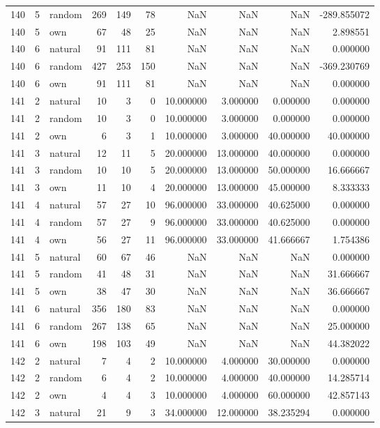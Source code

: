 \begin{table}[htbp]
\begin{tabular}{rrlrrrrrrr}
140 & 5 & random & 269 & 149 & 78 & NaN & NaN & NaN & -289.855072 \\
140 & 5 & own & 67 & 48 & 25 & NaN & NaN & NaN & 2.898551 \\
140 & 6 & natural & 91 & 111 & 81 & NaN & NaN & NaN & 0.000000 \\
140 & 6 & random & 427 & 253 & 150 & NaN & NaN & NaN & -369.230769 \\
140 & 6 & own & 91 & 111 & 81 & NaN & NaN & NaN & 0.000000 \\
141 & 2 & natural & 10 & 3 & 0 & 10.000000 & 3.000000 & 0.000000 & 0.000000 \\
141 & 2 & random & 10 & 3 & 0 & 10.000000 & 3.000000 & 0.000000 & 0.000000 \\
141 & 2 & own & 6 & 3 & 1 & 10.000000 & 3.000000 & 40.000000 & 40.000000 \\
141 & 3 & natural & 12 & 11 & 5 & 20.000000 & 13.000000 & 40.000000 & 0.000000 \\
141 & 3 & random & 10 & 10 & 5 & 20.000000 & 13.000000 & 50.000000 & 16.666667 \\
141 & 3 & own & 11 & 10 & 4 & 20.000000 & 13.000000 & 45.000000 & 8.333333 \\
141 & 4 & natural & 57 & 27 & 10 & 96.000000 & 33.000000 & 40.625000 & 0.000000 \\
141 & 4 & random & 57 & 27 & 9 & 96.000000 & 33.000000 & 40.625000 & 0.000000 \\
141 & 4 & own & 56 & 27 & 11 & 96.000000 & 33.000000 & 41.666667 & 1.754386 \\
141 & 5 & natural & 60 & 67 & 46 & NaN & NaN & NaN & 0.000000 \\
141 & 5 & random & 41 & 48 & 31 & NaN & NaN & NaN & 31.666667 \\
141 & 5 & own & 38 & 47 & 30 & NaN & NaN & NaN & 36.666667 \\
141 & 6 & natural & 356 & 180 & 83 & NaN & NaN & NaN & 0.000000 \\
141 & 6 & random & 267 & 138 & 65 & NaN & NaN & NaN & 25.000000 \\
141 & 6 & own & 198 & 103 & 49 & NaN & NaN & NaN & 44.382022 \\
142 & 2 & natural & 7 & 4 & 2 & 10.000000 & 4.000000 & 30.000000 & 0.000000 \\
142 & 2 & random & 6 & 4 & 2 & 10.000000 & 4.000000 & 40.000000 & 14.285714 \\
142 & 2 & own & 4 & 4 & 3 & 10.000000 & 4.000000 & 60.000000 & 42.857143 \\
142 & 3 & natural & 21 & 9 & 3 & 34.000000 & 12.000000 & 38.235294 & 0.000000 \\

\end{tabular}
\end{table}
